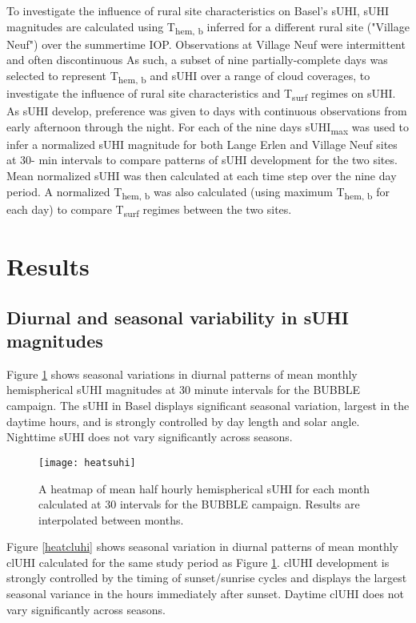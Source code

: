 \begin{bibunit}
To investigate the influence of rural site characteristics on Basel's sUHI, sUHI magnitudes are calculated using T\textsubscript{hem, b} inferred for a different rural site ("Village Neuf") over the summertime IOP. Observations at Village Neuf were intermittent and often discontinuous As such, a subset of nine partially-complete days was selected to represent T\textsubscript{hem, b} and sUHI over a range of cloud coverages, to investigate the influence of rural site characteristics and T\textsubscript{surf} regimes on sUHI. As sUHI develop, preference was given to days with continuous observations from early afternoon through the night. For each of the nine days sUHI\textsubscript{max} was used to infer a normalized sUHI magnitude for both Lange Erlen and Village Neuf sites at 30- \si{\minute} intervals to compare patterns of sUHI development for the two sites. Mean normalized sUHI was then calculated at each time step over the nine day period. A normalized T\textsubscript{hem, b} was also calculated (using maximum T\textsubscript{hem, b} for each day) to compare T\textsubscript{surf} regimes between the two sites.

\section{Results}

\subsection{Diurnal and seasonal variability in sUHI magnitudes}

Figure \ref{heatsuhi} shows seasonal variations in diurnal patterns of mean monthly hemispherical sUHI magnitudes at 30 minute intervals for the BUBBLE campaign. The sUHI in Basel displays significant seasonal variation, largest in the daytime hours, and is strongly controlled by day length and solar angle. Nighttime sUHI does not vary significantly across seasons. 

\begin{figure}[H]
	\centering
	\texttt{[image: heatsuhi]}
	\caption{A heatmap of mean half hourly hemispherical sUHI for each month calculated at 30 \si{\min} intervals for the BUBBLE campaign. Results are interpolated between months.}
	\label{heatsuhi}
\end{figure}

Figure \ref{heatcluhi} shows seasonal variation in diurnal patterns of mean monthly clUHI calculated for the same study period as Figure \ref{heatsuhi}. clUHI development is strongly controlled by the timing of sunset/sunrise cycles and displays the largest seasonal variance in the hours immediately after sunset. Daytime clUHI does not vary significantly across seasons. 


\end{bibunit}
